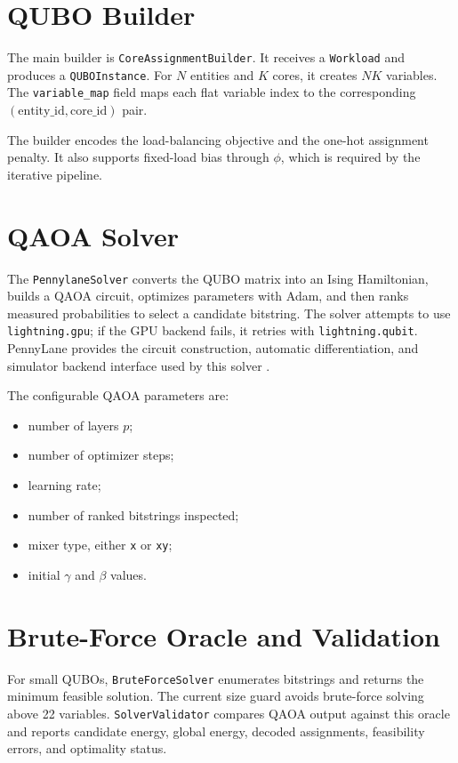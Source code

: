 \documentclass[12pt,a4paper,oneside]{report}
\begin{document}
\section{QUBO Builder}

The main builder is \texttt{CoreAssignmentBuilder}. It receives a
\texttt{Workload} and produces a \texttt{QUBOInstance}. For \(N\) entities and
\(K\) cores, it creates \(N K\) variables. The \texttt{variable\_map} field maps
each flat variable index to the corresponding \((\text{entity\_id},
\text{core\_id})\) pair.

The builder encodes the load-balancing objective and the one-hot assignment
penalty. It also supports fixed-load bias through \(\phi\), which is required by
the iterative pipeline.

\section{QAOA Solver}

The \texttt{PennylaneSolver} converts the QUBO matrix into an Ising Hamiltonian,
builds a QAOA circuit, optimizes parameters with Adam, and then ranks measured
probabilities to select a candidate bitstring. The solver attempts to use
\texttt{lightning.gpu}; if the GPU backend fails, it retries with
\texttt{lightning.qubit}. PennyLane provides the circuit construction,
automatic differentiation, and simulator backend interface used by this solver
\cite{pennylane}.

The configurable QAOA parameters are:

\begin{itemize}
  \item number of layers \(p\);
  \item number of optimizer steps;
  \item learning rate;
  \item number of ranked bitstrings inspected;
  \item mixer type, either \texttt{x} or \texttt{xy};
  \item initial \(\gamma\) and \(\beta\) values.
\end{itemize}

\section{Brute-Force Oracle and Validation}

For small QUBOs, \texttt{BruteForceSolver} enumerates bitstrings and returns the
minimum feasible solution. The current size guard avoids brute-force solving
above 22 variables. \texttt{SolverValidator} compares QAOA output against this
oracle and reports candidate energy, global energy, decoded assignments,
feasibility errors, and optimality status.
\end{document}

